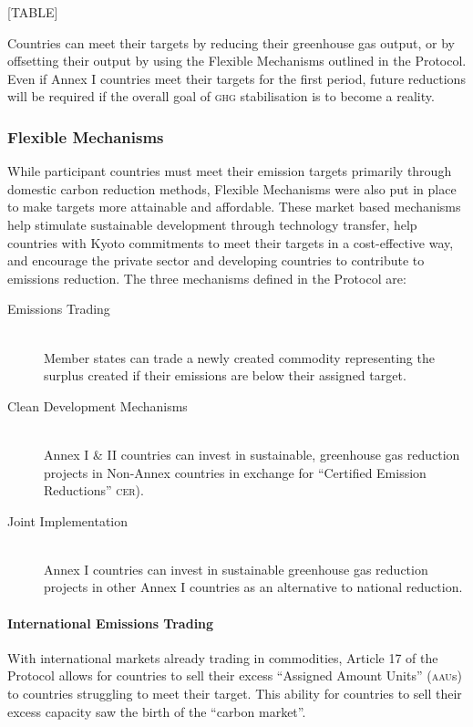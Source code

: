 \documentclass[]{article} %
\begin{document}
[TABLE]

Countries can meet their targets by reducing their greenhouse gas output, or by offsetting their output by using the Flexible Mechanisms outlined in the Protocol. Even if Annex I countries meet their targets for the first period, future reductions will be required if the overall goal of \textsc{ghg} stabilisation is to become a reality.

\subsubsection{Flexible Mechanisms}

While participant countries must meet their emission targets primarily through domestic carbon reduction methods, Flexible Mechanisms were also put in place to make targets more attainable and affordable. These market based mechanisms help stimulate sustainable development through technology transfer, help countries with Kyoto commitments to meet their targets in a cost-effective way, and encourage the private sector and developing countries to contribute to emissions reduction. The three mechanisms defined in the Protocol are:

\begin{description}
	\item[Emissions Trading] \hfill \\
	Member states can trade a newly created commodity representing the surplus created if their emissions are below their assigned target.
	
	\item[Clean Development Mechanisms] \hfill \\
	Annex I \& II countries can invest in sustainable, greenhouse gas reduction projects in Non-Annex countries in exchange for “Certified Emission Reductions” \textsc{cer}).~\cite{UNFCCC-05}

	\item[Joint Implementation] \hfill \\
	Annex I countries can invest in sustainable greenhouse gas reduction projects in other Annex I countries as an alternative to national reduction.
\end{description}

\paragraph{International Emissions Trading}

With international markets already trading in commodities, Article 17 of the Protocol allows for countries to sell their excess “Assigned Amount Units” (\textsc{aau}s) to countries struggling to meet their target. This ability for countries to sell their excess capacity saw the birth of the “carbon market”.
\end{document}
